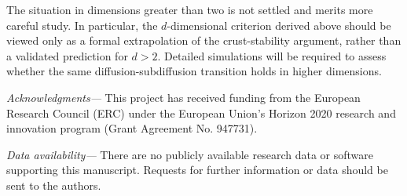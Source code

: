 \documentclass[reprint,superscriptaddress]{revtex4-2}
\begin{document}
The situation in dimensions greater than two is not settled and merits more careful study. In particular, the $d$-dimensional criterion derived above should be viewed only as a formal extrapolation of the crust-stability argument, rather than a validated prediction for $d>2$. Detailed simulations will be required to assess whether the same diffusion-subdiffusion transition holds in higher dimensions.

\textit{Acknowledgments—} This project has received funding from the European Research Council (ERC) under the European Union’s Horizon 2020 research and innovation program (Grant Agreement No. 947731).

\textit{Data availability—} There are no publicly available research data or software supporting this manuscript. Requests for further information or data should be sent to the authors.
\end{document}
